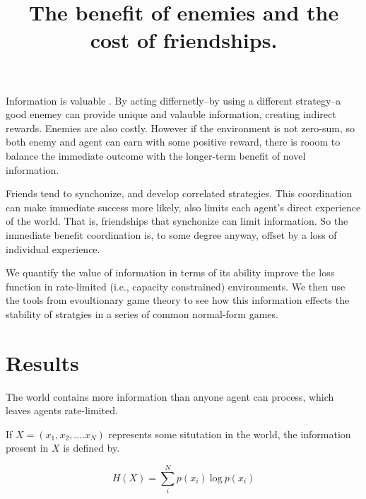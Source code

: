 \documentclass[8pt]{article}
\title{The benefit of enemies and the cost of friendships.}
\begin{document}

\section*{}
Information is valuable \cite{Kakade2002,Bunzeck2006,Dezza2017}. By acting differnetly--by using a different strategy--a good enemey can provide unique and valauble information, creating indirect rewards.  Enemies are also costly. However if the environment is not zero-sum, so both enemy and agent can earn with some positive reward, there is rooom to balance the immediate outcome with the longer-term benefit of novel information.

Friends tend to synchonize, and develop correlated strategies. This coordination can make immediate success more likely, also limits each agent's direct experience of the world. That is, friendships that synchonize can limit information. So the immediate benefit coordination is, to some degree anyway, offset by a loss of individual experience. 


We quantify the value of information in terms of its ability improve the loss function in rate-limited (i.e., capacity constrained) environments. We then use the tools from evoultionary game theory to see how  this information effects the stability of stratgies in a series of common normal-form games.

\section*{Results}
The world contains more information than anyone agent can process, which leaves agents rate-limited. 

If $X = (x_1, x_2, .... x_N)$ represents some situtation in the world, the information present in $X$ is defined by.

\begin{equation}
H(X) = \sum^{N}_{i} p(x_i) \ \text{log} \ p(x_i)
\end{equation}
\end{document}
